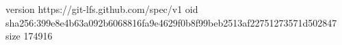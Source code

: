 version https://git-lfs.github.com/spec/v1
oid sha256:399e8e4b63a092b6068816fa9e4629f0b8f99beb2513af22751273571d502847
size 174916
